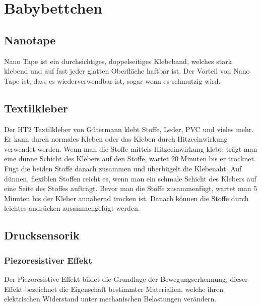 \section[Babybettchen]{Babybettchen}

\subsection[Textilkleber]{Nanotape\authorlinda}
Nano Tape ist ein durchsichtiges, doppelseitiges Klebeband, welches stark klebend und auf fast jeder glatten Oberfläche haftbar ist. Der Vorteil von Nano Tape ist, dass es wiederverwendbar ist, 
sogar wenn es schmutzig wird. \cite{magnetshop_nano_tape}

\subsection[Textilkleber]{Textilkleber\authorlinda}
Der HT2 Textilkleber von Gütermann klebt Stoffe, Leder, PVC und vieles mehr. Er kann durch normales Kleben oder das Kleben durch Hitzeeinwirkung verwendet werden. Wenn man die Stoffe mittels Hitzeeinwirkung klebt, trägt man eine dünne Schicht des Klebers  auf den Stoffe, wartet 20 Minuten bis er trocknet. Fügt die beiden Stoffe danach zusammen und überbügelt die Klebenaht. 
\noindent
Auf dünnen, flexiblen Stoffen reicht es, wenn man ein schmale Schicht des Klebers auf eine Seite des Stoffes aufträgt. Bevor man die Stoffe zusammenfügt, wartet man 5 Minuten bis der Kleber annähernd trocken ist. 
Danach können die Stoffe durch leichtes andrücken zusammengefügt werden. \cite{naehwelt_ht2_textilkleber}



\subsection[Drucksensorik]{Drucksensorik\authorlinda}
\subsubsection{Piezoresistiver Effekt}
Der Piezoresistive Effekt bildet die Grundlage der Bewegungserkennung, dieser Effekt bezeichnet die Eigenschaft bestimmter Materialien, welche ihren elektrischen Widerstand unter mechanischen Belastungen verändern. \cite{electricity-magnetism_piezoresistive}

